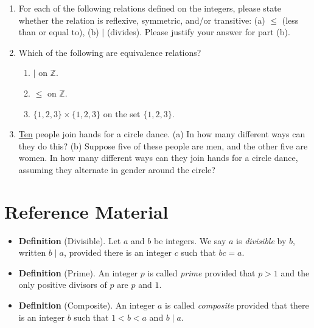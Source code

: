 \documentclass[11pt]{article}
\newcommand{\set}[1]{\{ #1 \}}
\begin{document}
\begin{enumerate}
\item For each of the following relations defined on the integers, please state whether the relation is reflexive, symmetric, and/or transitive:  (a) $\leq$ (less than or equal to), (b) $\mid$ (divides). Please justify your answer for part (b).
\item Which of the following are equivalence relations?
\begin{enumerate}
\item $\mid$ on $\mathbb{Z}$.
\item $\leq$ on $\mathbb{Z}$.
\item $\set{1,2,3} \times \set{1,2,3}$ on the set $\set{1,2,3}$.
\end{enumerate}
\item \underline{Ten} people join hands for a circle dance. (a) In how many different ways can they do this? (b) Suppose five of these people are men, and the other five are women. In how many different ways can they join hands for a circle dance, assuming they alternate in gender around the circle?
\end{enumerate}


\section*{Reference Material}

\begin{itemize}
\item \textbf{Definition} (Divisible). Let $a$ and $b$ be integers. We say $a$ is \textit{divisible} by $b$, written $b \mid a$, provided there is an integer $c$ such that $bc=a$.
\item \textbf{Definition} (Prime). An integer $p$ is called \textit{prime} provided that $p>1$ and the only positive divisors of $p$ are $p$ and $1$.
\item \textbf{Definition} (Composite). An integer $a$ is called \textit{composite} provided that there is an integer $b$ such that $1<b<a$ and $b \mid a$.
\end{itemize}
\end{document}
